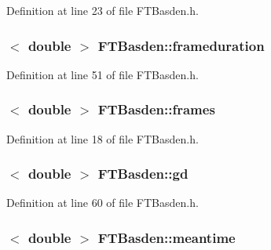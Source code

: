 Definition at line 23 of file FTBasden.h.

\hypertarget{classFTBasden_a5ccd0ee80c5cb01a9538bd72e6079af4}{
\subsubsection[{frameduration}]{$<$ double $>$ {\bf FTBasden::frameduration}}}
\label{classFTBasden_a5ccd0ee80c5cb01a9538bd72e6079af4}


Definition at line 51 of file FTBasden.h.

\hypertarget{classFTBasden_a4dcdeaee548ee6378d126b348c943f39}{
\subsubsection[{frames}]{$<$ double $>$ {\bf FTBasden::frames}}}
\label{classFTBasden_a4dcdeaee548ee6378d126b348c943f39}


Definition at line 18 of file FTBasden.h.

\hypertarget{classFTBasden_aecafc948a0316d86977907073b6a6603}{
\subsubsection[{gd}]{$<$ double $>$ {\bf FTBasden::gd}}}
\label{classFTBasden_aecafc948a0316d86977907073b6a6603}


Definition at line 60 of file FTBasden.h.

\hypertarget{classFTBasden_a185b651a1ce01fbe60e51ce748b07899}{
\subsubsection[{meantime}]{$<$ double $>$ {\bf FTBasden::meantime}}}
\label{classFTBasden_a185b651a1ce01fbe60e51ce748b07899}



